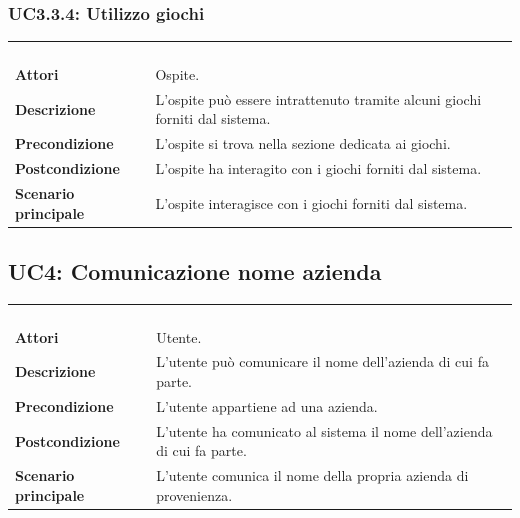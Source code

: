 \subsubsection{UC3.3.4: Utilizzo giochi}
\label{UC3.3.4}
\begin{longtable}{l|p{10cm}}
\rowcolor[gray]{0.8} \multicolumn{2}{c}{} \\
\rowcolor[gray]{0.8} \multicolumn{2}{c}{\textbf{UC3.3.4 - Utilizzo giochi}} \\
\rowcolor[gray]{0.8} \multicolumn{2}{c}{} \\
\hline
&\\
\textbf{Attori} & Ospite.\\[7pt]
\textbf{Descrizione} & L'ospite può essere intrattenuto tramite alcuni giochi forniti dal sistema.\\[7pt]
\textbf{Precondizione} & L'ospite si trova nella sezione dedicata ai giochi.\\[7pt]
\textbf{Postcondizione} & L'ospite ha interagito con i giochi forniti dal sistema.\\[7pt]
\textbf{Scenario principale} &L'ospite interagisce con i giochi forniti dal sistema.\\[7pt]\hline
\end{longtable}

\subsection{UC4: Comunicazione nome azienda}
\label{UC4}
\begin{longtable}{l|p{10cm}}
\rowcolor[gray]{0.8} \multicolumn{2}{c}{} \\
\rowcolor[gray]{0.8} \multicolumn{2}{c}{\textbf{UC4 - Comunicazione nome azienda}} \\
\rowcolor[gray]{0.8} \multicolumn{2}{c}{} \\
\hline
&\\
\textbf{Attori} & Utente.\\[7pt]
\textbf{Descrizione} & L'utente può comunicare il nome dell'azienda di cui fa parte.\\[7pt]
\textbf{Precondizione} & L'utente appartiene ad una azienda.\\[7pt]
\textbf{Postcondizione} & L'utente ha comunicato al sistema il nome dell'azienda di cui fa parte.\\[7pt]
\textbf{Scenario principale} &L'utente comunica il nome della propria azienda di provenienza.\\[7pt]\hline
\end{longtable}

